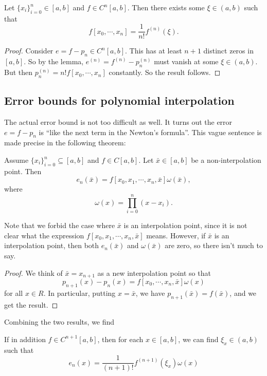 \documentclass[a4paper]{article}
\begin{document}
\begin{thm}
  Let $\{x_i\}_{i = 0}^n \in [a, b]$ and $f \in C^n[a, b]$. Then there exists some $\xi \in (a, b)$ such that
  \[
    f[x_0, \cdots, x_n] = \frac{1}{n!} f^{(n)}(\xi).
  \]
\end{thm}

\begin{proof}
  Consider $e = f - p_n \in C^n[a, b]$. This has at least $n + 1$ distinct zeros in $[a, b]$. So by the lemma, $e^{(n)} = f^{(n)} - p_n^{(n)}$ must vanish at some $\xi \in (a, b)$. But then $p_n^{(n)} = n! f[x_0, \cdots, x_n]$ constantly. So the result follows.
\end{proof}

\subsection{Error bounds for polynomial interpolation}
The actual error bound is not too difficult as well. It turns out the error $e = f - p_n$ is ``like the next term in the Newton's formula''. This vague sentence is made precise in the following theorem:
\begin{thm}
  Assume $\{x_i\}_{i = 0}^n \subseteq [a, b]$ and $f \in C[a, b]$. Let $\bar{x} \in [a, b]$ be a non-interpolation point. Then
  \[
    e_n(\bar{x}) = f[x_0, x_1, \cdots, x_n, \bar{x}] \omega(\bar{x}),
  \]
  where
  \[
    \omega(x) = \prod_{i = 0}^n (x - x_i).
  \]
\end{thm}
Note that we forbid the case where $\bar{x}$ is an interpolation point, since it is not clear what the expression $f[x_0, x_1, \cdots, x_n, \bar{x}]$ means. However, if $\bar{x}$ is an interpolation point, then both $e_n(\bar x)$ and $\omega(\bar{x})$ are zero, so there isn't much to say.

\begin{proof}
  We think of $\bar{x} = x_{n + 1}$ as a new interpolation point so that
  \[
    p_{n + 1}(x) - p_n(x) = f[x_0, \cdots, x_n, \bar{x}] \omega(x)
  \]
  for all $x \in R$. In particular, putting $x = \bar{x}$, we have $p_{n + 1}(\bar{x}) = f(\bar{x})$, and we get the result.
\end{proof}

Combining the two results, we find
\begin{thm}
  If in addition $f \in C^{n + 1}[a, b]$, then for each $x \in [a, b]$, we can find $\xi_x \in (a, b)$ such that
  \[
    e_n(x) = \frac{1}{(n + 1)!} f^{(n + 1)}(\xi_x) \omega(x)
  \]
\end{thm}
\end{document}
